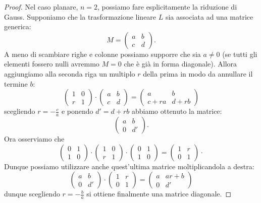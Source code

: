 \begin{proof}
Nel caso planare, $n=2$, possiamo fare esplicitamente la riduzione di Gauss. 
Supponiamo che la trasformazione lineare $L$ sia associata ad una matrice generica:
\[
  M = \begin{pmatrix} a&b\\c&d\end{pmatrix}.
\]
A meno di scambiare righe e colonne possiamo supporre che sia $a\neq 0$ 
(se tutti gli elementi fossero nulli avremmo $M=0$ che è già in forma diagonale). 
Allora aggiungiamo alla seconda riga un multiplo $r$ della prima in modo da annullare il termine $b$:
\[
\begin{pmatrix} 1&0\\r&1
\end{pmatrix}\cdot
    \begin{pmatrix} a&b\\c&d
    \end{pmatrix}
  =
  \begin{pmatrix} a&b\\c+ra&d+rb
  \end{pmatrix}
\]
scegliendo $r=-\frac c a$
e ponendo $d'=d+rb$
abbiamo ottenuto la matrice:
\[
\begin{pmatrix} a&b\\0&d'
\end{pmatrix}.
\]
Ora osserviamo che
\[
      \begin{pmatrix} 0&1\\1&0
      \end{pmatrix}\cdot
      \begin{pmatrix} 1&0\\r&1
      \end{pmatrix}\cdot
      \begin{pmatrix} 0&1\\1&0
      \end{pmatrix}
      =
      \begin{pmatrix} 1&r\\0&1
      \end{pmatrix}\cdot
\]
Dunque possiamo utilizzare anche quest'ultima matrice
moltiplicandola a destra:
\[
\begin{pmatrix} a&b\\0&d'
\end{pmatrix}\cdot
  \begin{pmatrix} 1&r\\0&1
  \end{pmatrix}
  =
  \begin{pmatrix} a&ar+b\\0&d'
  \end{pmatrix}
\]
dunque scegliendo $r=-\frac b a$ si ottiene finalmente
una matrice diagonale.
\end{proof}

